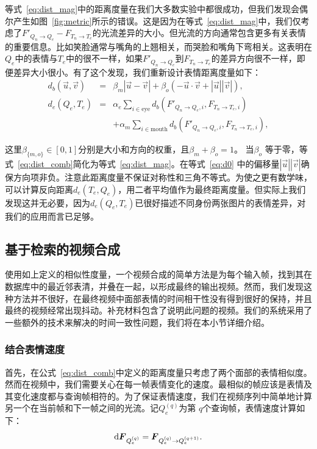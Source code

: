 等式~\ref{eq:dist_mag}中的距离度量在我们大多数实验中都很成功，但我们发现会偶尔产生如图~\ref{fig:metric}所示的错误。这是因为在等式~\ref{eq:dist_mag}中，我们仅考虑了\mbox{\boldmath $F$}$'_{Q_n \to Q_e}-$\mbox{\boldmath $F$}$_{T_n \to T_e}$的光流差异的大小。但光流的方向通常包含更多有关表情的重要信息。比如笑脸通常与嘴角的上翘相关，而哭脸和嘴角下弯相关。这表明在$Q_e$中的表情与$T_e$中的很不一样，如果\mbox{\boldmath $F$}$'_{Q_n \to Q_e}$到\mbox{\boldmath $F$}$_{T_n \to T_e}$的差异方向很不一样，即便差异大小很小。有了这个发现，我们重新设计表情距离度量如下：
\setlength\arraycolsep{1pt}
\begin{eqnarray}
d_b(\vec{u},\vec{v})&=&\beta_m|\vec{u}-\vec{v}|+\beta_o(-\vec{u}\cdot\vec{v}+|\vec{u}||\vec{v}|), \label{eq:d0}\\
d_e(Q_e, T_e)&=&\alpha_{e}\sum_{i\in\text{eye}}d_b(F'_{Q_n \to Q_e,i}, F_{T_n \to T_e,i})\nonumber\\
           &&+\alpha_{m}\sum_{i\in\text{mouth}}d_b(F'_{Q_n \to Q_e, i}, F_{T_n \to T_e, i}),\label{eq:dist_comb}
\end{eqnarray}

这里$\beta_{\{m, o\}}\in[0,1]$分别是大小和方向的权重，且$\beta_m+\beta_o=1$。 当$\beta_o$ 等于零，等式~\ref{eq:dist_comb}简化为等式~\ref{eq:dist_mag}。在等式~\ref{eq:d0} 中的偏移量$|\vec{u}||\vec{v}|$确保方向项非负。注意此距离度量不保证对称性和三角不等式。为使之更有数学味，可以计算反向距离$d_e(T_e,Q_e)$，用二者平均值作为最终距离度量。但实际上我们发现这并无必要，因为$d_e(Q_e, T_e)$已很好描述不同身份两张图片的表情差异，对我们的应用而言已足够。
\subsection{基于检索的视频合成}\label{sec:retrieval}
使用如上定义的相似性度量，一个视频合成的简单方法是为每个输入帧，找到其在数据库中的最近邻表清，并叠在一起，以形成最终的输出视频。然而，我们发现这种方法并不很好，在最终视频中面部表情的时间相干性没有得到很好的保持，并且最终的视频经常出现抖动。补充材料包含了说明此问题的视频。我们的系统采用了一些额外的技术来解决的时间一致性问题，我们将在本小节详细介绍。
\subsubsection{结合表情速度}
首先，在公式~\ref{eq:dist_comb}中定义的距离度量只考虑了两个面部的表情相似度。然而在视频中，我们需要关心在每一帧表情变化的速度。最相似的帧应该是表情及其变化速度都与查询帧相符的。为了保证表情速度，我们在视频序列中简单地计算另一个在当前帧和下一帧之间的光流。记$Q_e^{(q)}$为第 $q$个查询帧，表情速度计算如下：
\begin{equation}\label{eq:dF_Q}
\text{d} \mbox{\boldmath $F$}_{Q_e^{(q)}} = \mbox{\boldmath $F$}_{Q_e^{(q)}\to Q_e^{(q+1)}}.
\end{equation}

